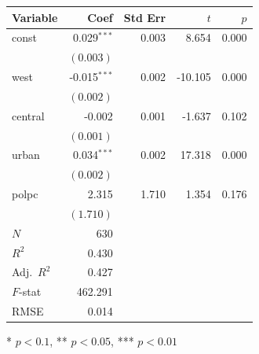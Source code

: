 \renewcommand{\arraystretch}{1.1}
\setlength{\tabcolsep}{6pt}
\begin{tabular}{lrrrr}
\hline
Variable & Coef & Std Err & $t$ & $p$ \\
\hline
const & 0.029$^{\ast\ast\ast}$ & 0.003 & 8.654 & 0.000 \\
 & $(0.003)$ & & & \\
west & -0.015$^{\ast\ast\ast}$ & 0.002 & -10.105 & 0.000 \\
 & $(0.002)$ & & & \\
central & -0.002 & 0.001 & -1.637 & 0.102 \\
 & $(0.001)$ & & & \\
urban & 0.034$^{\ast\ast\ast}$ & 0.002 & 17.318 & 0.000 \\
 & $(0.002)$ & & & \\
polpc & 2.315 & 1.710 & 1.354 & 0.176 \\
 & $(1.710)$ & & & \\
\hline
$N$ & 630 & & & \\
$R^2$ & 0.430 & & & \\
Adj.\ $R^2$ & 0.427 & & & \\
$F$-stat & 462.291 & & & \\
RMSE & 0.014 & & & \\
\hline
\end{tabular}
\vspace{2pt}
\begin{flushleft}\footnotesize{* $p<0.1$, ** $p<0.05$, *** $p<0.01$}\end{flushleft}